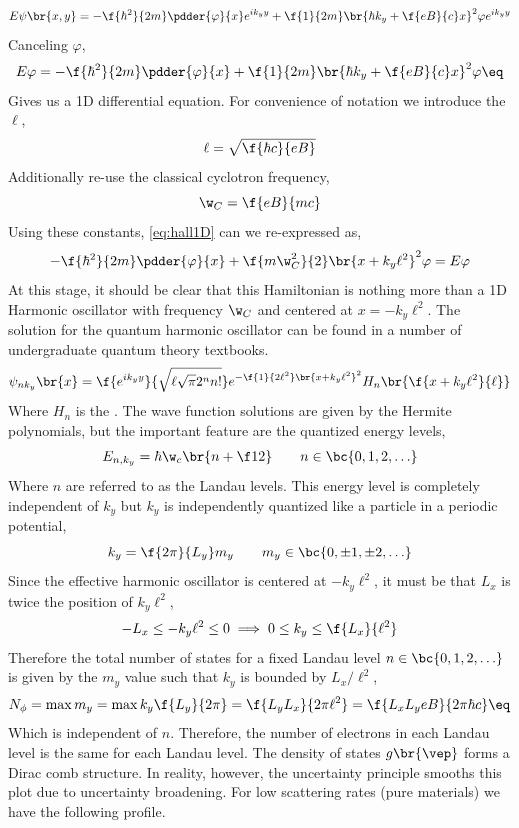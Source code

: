 \documentclass{article}
\begin{document}
\[ E \psi\br{x,y}= - \f{\hbar^2}{2m} \pdder{\varphi}{x} e^{ik_yy} + \f{1}{2m}\br{\hbar k_y + \f{eB}{c}x}^2 \varphi e^{ik_yy} \]
Canceling $\varphi$,
\[ E \varphi = - \f{\hbar^2}{2m} \pdder{\varphi}{x} + \f{1}{2m}\br{\hbar k_y + \f{eB}{c}x}^2 \varphi \eq \label{eq:hall1D}\]
Gives us a 1D differential equation. For convenience of notation we introduce the  $\ell$,
\[ \ell = \sqrt{\f{\hbar c}{eB}} \]
Additionally re-use the classical cyclotron frequency,
\[ \w_{C} = \f{eB}{mc} \]
Using these constants, \cref{eq:hall1D} can we re-expressed as,
\[ -\f{\hbar^2}{2m} \pdder{\varphi}{x} + \f{m\w_{C}^2}{2} \br{x + k_y \ell^{2}}^2 \varphi = E \varphi \]
At this stage, it should be clear that this Hamiltonian is nothing more than a 1D Harmonic oscillator with frequency $\w_{C}$ and centered at $x = - k_y \ell^{2}$. The solution for the quantum harmonic oscillator can be found in a number of undergraduate quantum theory textbooks.
\[ \psi_{n k_y}\br{x} = \f{e^{ik_y y}}{\sqrt{\ell \sqrt{\pi} 2^{n} n!}} e^{-\f{1}{2 \ell^2} \br{x + k_y \ell^2}^2} H_n\br{\f{x + k_y \ell^2}{\ell}} \]
Where $H_n$ is the . The wave function solutions are given by the Hermite polynomials, but the important feature are the quantized energy levels,
\[ E_{n,k_y} = \hbar \w_c \br{n + \f12} \qquad n \in \bc{0, 1, 2, \ldots} \]
Where $n$ are referred to as the Landau levels. This energy level is completely independent of $k_y$ but $k_y$ is independently quantized like a particle in a periodic potential,
\[ k_y = \f{2\pi}{L_y} m_y \qquad m_y \in \bc{0, \pm 1, \pm 2, \ldots}\]
Since the effective harmonic oscillator is centered at $-k_y \ell^2$, it must be that $L_x$ is twice the position of $k_y \ell^2$,
\[ -L_x \leq -k_y \ell^2 \leq 0 \implies 0 \leq k_y \leq \f{L_x}{\ell^2} \]
Therefore the total number of states for a fixed Landau level $n \in \bc{0,1,2,\ldots}$ is given by the $m_y$ value such that $k_y$ is bounded by $L_x / \ell^2$,
\[ N_{\phi} = \max{m_y} = \max{k_y} \f{L_y}{2\pi} = \f{L_yL_x}{2\pi\ell^2} = \f{L_xL_y eB}{2 \pi \hbar c}  \eq \label{eq:landau_occupancy}\]
Which is independent of $n$. Therefore, the number of electrons in each Landau level is the same for each Landau level. The density of states $g\br{\vep}$ forms a Dirac comb structure. In reality, however, the uncertainty principle smooths this plot due to uncertainty broadening. For low scattering rates (pure materials) we have the following profile.
\begin{center}
\end{center}
\end{document}
